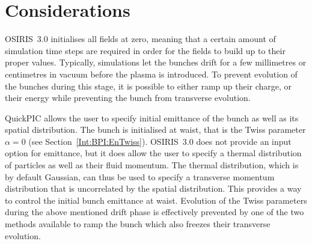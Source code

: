 \section{Considerations}
\label{PIC:Full}

OSIRIS~3.0 initialises all fields at zero, meaning that a certain amount of simulation time steps are required in order for the fields to build up to their proper values.
Typically, simulations let the bunches drift for a few millimetres or centimetres in vacuum before the plasma is introduced.
To prevent evolution of the bunches during this stage, it is possible to either ramp up their charge, or their energy while preventing the bunch from transverse evolution.

QuickPIC allows the user to specify initial emittance of the bunch as well as its spatial distribution.
The bunch is initialised at waist, that is the Twiss parameter $\alpha = 0$ (see Section~\ref{Int:BPI:EnTwiss}).
OSIRIS~3.0 does not provide an input option for emittance, but it does allow the user to specify a thermal distribution of particles as well as their fluid momentum.
The thermal distribution, which is by default Gaussian, can thus be used to specify a transverse momentum distribution that is uncorrelated by the spatial distribution.
This provides a way to control the initial bunch emittance at waist.
Evolution of the Twiss parameters during the above mentioned drift phase is effectively prevented by one of the two methods available to ramp the bunch which also freezes their transverse evolution.
